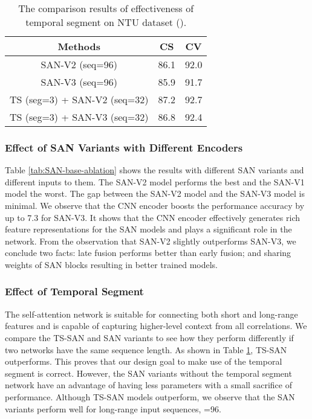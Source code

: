 \documentclass[10pt,twocolumn,letterpaper]{article}
\begin{document}
\begin{table}[!t]
    \begin{center}
	\begin{tabular}{|c|c|c|}
		\hline
		Methods & CS & CV\\
		\hline
		SAN-V2 (seq=96)  & 86.1 & 92.0\\
		SAN-V3 (seq=96)  & 85.9 & 91.7\\
		TS (seg=3) + SAN-V2 (seq=32)  & 87.2 & 92.7\\
		TS (seg=3) + SAN-V3 (seq=32)  & 86.8 & 92.4\\
		\hline
	\end{tabular}
	\end{center}
	\vspace{-0.15in}
	\caption{The comparison results of effectiveness of temporal segment on NTU dataset ().}
	\label{tab:TS-SAN-ablation}
\end{table}

\subsubsection{Effect of SAN Variants with Different Encoders}
Table \ref{tab:SAN-base-ablation} shows the results with different SAN variants and different inputs to them.
The SAN-V2 model performs the best and the SAN-V1 model the worst. The gap between the SAN-V2 model and the SAN-V3 model is minimal. We observe that the CNN encoder boosts the performance accuracy by up to 7.3 for SAN-V3. It shows that the CNN encoder effectively generates rich feature representations for the SAN models and plays a significant role in the network.
From the observation that SAN-V2 slightly outperforms SAN-V3, we conclude two facts: late fusion performs better than early fusion; and sharing weights of SAN blocks resulting in better trained models.

\subsubsection{Effect of Temporal Segment}
The self-attention network is suitable for connecting both short and long-range features and is capable of capturing higher-level context from all correlations. We compare the TS-SAN and SAN variants to see how they perform differently if two networks have the same sequence length. As shown in Table \ref{tab:TS-SAN-ablation}, TS-SAN outperforms. This proves that our design goal to make use of the temporal segment is correct. However, the SAN variants without the temporal segment network have an advantage of having less parameters with a small sacrifice of performance.
Although TS-SAN models outperform, we observe that the SAN variants perform well for long-range input sequences, =96.
\end{document}

